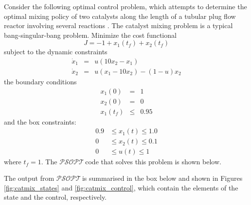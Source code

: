 \documentclass[a4paper,11pt]{report}    %
\newcommand{\psopt}{$\mathcal{PSOPT}$\,}  %
\newenvironment{shadedframe}{%
  \def\FrameCommand{\fcolorbox{black}{shadecolor}}%
  \MakeFramed {\FrameRestore}}
{\endMakeFramed}
\begin{document}
Consider the following optimal control problem, which attempts to determine the optimal mixing policy
of two catalysts along the length of a tubular plug flow reactor involving several reactions
\cite{VonStryk:99}.  The catalyst mixing problem is a typical bang-singular-bang problem.  Minimize the cost functional
\begin{equation}
  J = -1 + x_1(t_f) + x_2(t_f)
\end{equation}
subject to the dynamic constraints
\begin{equation}
  \begin{array}{lcl}
    \dot x_1 & = & u(10x_2-x_1) \\
    \dot x_2 & = & u(x_1-10x_2) - (1-u)x_2
  \end{array}
\end{equation}
the boundary conditions
\begin{equation}
  \begin{array}{lcl}
    x_1(0) & = & 1 \\
    x_2(0) & = & 0 \\
    x_1(t_f) & \le & 0.95
  \end{array}
\end{equation}
and the box constraints:
\begin{equation}
   \begin{array}{lcl}
    0.9 & \le x_1(t) \le 1.0 \\
    0 & \le x_2(t) \le 0.1 \\
    0 & \le u(t)  \le 1 
  \end{array}
\end{equation}
where $t_f=1$. The
\psopt code that solves this problem is shown below.  

\tiny
\begin{shadedframe}

\end{shadedframe}
\normalsize


The output from \psopt is summarised in the box below and shown in Figures \ref{fig:catmix_states} and \ref{fig:catmix_control}, which contain the elements
of the state and the control, respectively.

\begin{shadedframe}

\end{shadedframe}
\end{document}
